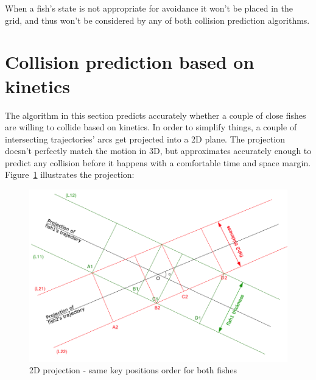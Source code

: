 When a fish's state is not appropriate for avoidance it won't be placed in the grid, and thus won't be considered by any of both collision prediction algorithms.

\label{subsec:appropriatestate}


\section{Collision prediction based on kinetics}
\label{sec:dynamic.prediction}

The algorithm in this section predicts accurately whether a couple of close fishes are willing to collide based on kinetics. In order to simplify things, a couple of intersecting trajectories' arcs get projected into a 2D plane. The projection doesn't perfectly match the motion in 3D, but approximates accurately enough to predict any collision before it happens with a comfortable time and space margin. Figure~\ref{fig:projection-abcd} illustrates the projection:

\begin{figure}[H]
   \centering
   \includegraphics[scale=0.5]{figures/projection-abcd.png}
   \caption{2D projection - same key positions order for both fishes}
   \label{fig:projection-abcd}
\end{figure}

